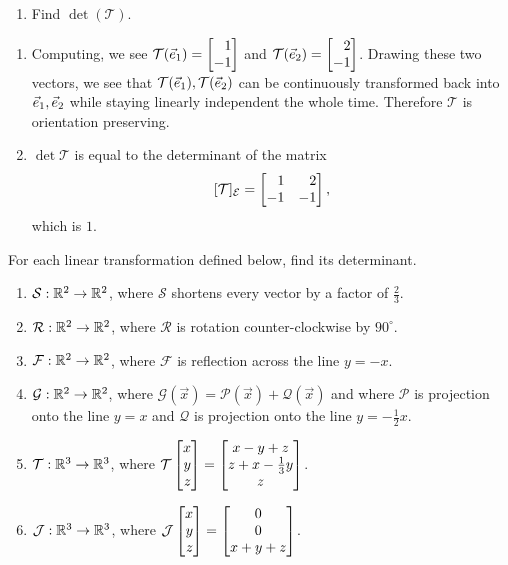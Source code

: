 \begin{exercises}
\begin{problist}
\begin{enumerate}
			\item Find $\det(\mathcal{T})$.
		\end{enumerate}
		\begin{solution}
			\begin{enumerate}
				\item Computing, we see $\mathcal T(\xhat) = \mat{1\\-1}$ and
					$\mathcal T(\yhat)=\mat{2\\-1}$. Drawing these two vectors, we see
					that $\mathcal T({\vec e_1}),\mathcal T({\vec e_2})$
					can be continuously transformed back into ${\vec e_1},{\vec e_2}$ while staying
					linearly independent the whole time. Therefore $\mathcal T$ is orientation
					preserving.

				\item $\det \mathcal T$ is equal to the determinant of the matrix
					\[
						[\mathcal T]_{\mathcal E}=\mat{
							1  & 2  \\
							-1 & -1
						},
					\]
					which is $1$.
			\end{enumerate}
		\end{solution}

		\prob For each linear transformation defined below, find its determinant.
		\begin{enumerate}
			\item $\mathcal{S}:\mathbb{R}^{2}\to\mathbb{R}^{2}$, where $\mathcal{S}$ shortens
				every vector by a factor of $\tfrac{2}{3}$.

			\item $\mathcal{R}:\mathbb{R}^{2}\to\mathbb{R}^{2}$, where $\mathcal{R}$ is rotation
				counter-clockwise by $90^{\circ}$.

			\item $\mathcal{F}:\mathbb{R}^{2}\to\mathbb{R}^{2}$, where $\mathcal{F}$ is
				reflection across the line $y=-x$.

			\item $\mathcal{G}:\mathbb{R}^{2}\to\mathbb{R}^{2}$, where
				$\mathcal{G}(\vec x)=\mathcal{P}(\vec x)+ \mathcal{Q}(\vec x)$
				and where $\mathcal{P}$ is projection onto the line $y=x$ and
				$\mathcal{Q}$ is projection onto the line $y=-\tfrac{1}{2}x$.

			\item $\mathcal{T}:\mathbb{R}^{3}\to\mathbb{R}^{3}$, where
				$\mathcal{T}\mat{x\\y\\z}=\matc{x-y+z\\z+x-\tfrac{1}{3}y\\z}$.

			\item $\mathcal{J}:\mathbb{R}^{3}\to\mathbb{R}^{3}$, where
				$\mathcal{J}\mat{x\\y\\z}=\matc{0\\0\\x+y+z}$.


\end{enumerate}
\end{problist}
\end{exercises}
